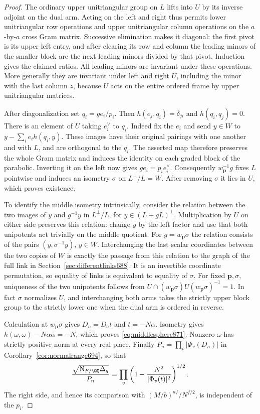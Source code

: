 \documentclass[a4paper,11pt]{article}
\theoremstyle{definition}
\theoremstyle{remark}
\numberwithin{equation}{section}
\begin{document}
\begin{proof}
The ordinary upper unitriangular group on \(L\) lifts into \(U\)
by its inverse adjoint on the dual arm. Acting on the left
and right thus permits lower unitriangular row operations and
upper unitriangular column operations on the \(a\)-by-\(a\)
cross Gram matrix. Successive elimination makes it diagonal:
the first pivot is its upper left entry, and after clearing its
row and column the leading minors of the smaller block are
the next leading minors divided by that pivot. Induction gives
the claimed ratios. All leading minors are invariant under these
operations. More generally they are invariant under left and
right \(U\), including the minor with the last column \(z\),
because \(U\) acts on the entire ordered frame by upper
unitriangular matrices.

After diagonalization set \(q_i=g e_i/p_i\).
Then \(h(e_j,q_i)=\delta_{ji}\) and \(h(q_i,q_j)=0\).
There is an element of \(U\) taking \(e_i^\vee\) to \(q_i\).
Indeed fix the \(e_i\) and send \(y\in W\) to
\(y-\sum_i e_i h(q_i,y)\). These images have their original
pairings with one another and with \(L\), and are orthogonal to
the \(q_i\). The asserted map therefore preserves the whole
Gram matrix and induces the identity on each graded block of
the parabolic. Inverting it on the left now gives
\(g e_i=p_i e_i^\vee\). Consequently \(w_{\mathbf p}^{-1}g\)
fixes \(L\) pointwise and induces an isometry \(\sigma\) on
\(L^\perp/L=W\). After removing \(\sigma\) it lies in \(U\),
which proves existence.

To identify the middle isometry intrinsically, consider the
relation between the two images of \(y\) and \(g^{-1}y\) in
\(L^\perp/L\), for \(y\in(L+gL)^\perp\). Multiplication by \(U\)
on either side preserves this relation: change \(y\) by the left
factor and use that both unipotents act trivially on the middle
quotient. For \(g=w_{\mathbf p}\sigma\) the relation consists
of the pairs \((y,\sigma^{-1}y)\), \(y\in W\). Interchanging the
last scalar coordinates between the two copies of \(W\) is
exactly the passage from this relation to the graph of the full
link in Section~\ref{sec:differentlinks688}. It is an invertible
coordinate permutation, so equality of links is equivalent to
equality of \(\sigma\). For fixed \(\mathbf p,\sigma\), uniqueness
of the two unipotents follows from
\(U\cap(w_{\mathbf p}\sigma)U(w_{\mathbf p}\sigma)^{-1}=1\).
In fact \(\sigma\) normalizes \(U\), and interchanging both arms
takes the strictly upper block group to the strictly lower one
when the dual arm is ordered in reverse.

Calculation at \(w_{\mathbf p}\sigma\) gives \(D_n=D_at\)
and \(t=-N\alpha\). Isometry gives
\(h(\omega,\omega)-N\alpha\bar\alpha=-N\), which proves
\eqref{eq:middlesphere871}. Nonzero \(\omega\) has strictly
positive norm at every real place. Finally \(P_n=\prod_v
|\Phi_v(D_n)|\) in Corollary~\ref{cor:normalrange694}, so that
\[
 \frac{\sqrt{\mathrm N_{F/\QQ}\Delta_g}}{P_n}
   =\prod_v\left(1-\frac{N^2}{|\Phi_v(t)|^2}\right)^{1/2}.
\]
The right side, and hence its comparison with
\((M/b)^{af}/N^{f/2}\), is independent of the \(p_i\).
\end{proof}
\end{document}
